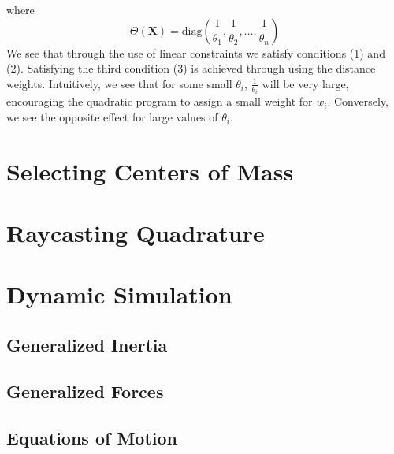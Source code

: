 where
\begin{equation}
     \Theta(\mathbf{X}) = \text{diag}\left( \frac{1}{\theta_1},\frac{1}{\theta_2},\dots,\frac{1}{\theta_n}\right)
\end{equation}
We see that through the use of linear constraints we satisfy conditions (1) and (2). Satisfying the third condition (3) is achieved through using the distance weights. Intuitively, we see that for some small $\theta_i$, $\frac{1}{\theta_i}$ will be very large, encouraging the quadratic program to assign a small weight for $w_i$. Conversely, we see the opposite effect for large values of $\theta_i$.

\section{Selecting Centers of Mass}
\section{Raycasting Quadrature}
\section{Dynamic Simulation}
\subsection{Generalized Inertia}
\subsection{Generalized Forces}
\subsection{Equations of Motion}



